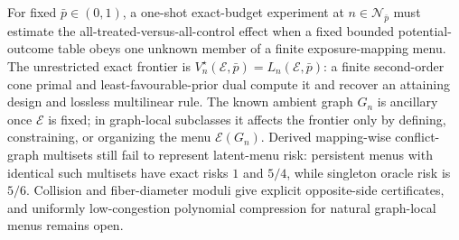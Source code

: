 For fixed \(\bar p\in(0,1)\), a one-shot exact-budget experiment at \(n\in\mathcal N_{\bar p}\) must estimate the all-treated-versus-all-control effect when a fixed bounded potential-outcome table obeys one unknown member of a finite exposure-mapping menu. The unrestricted exact frontier is \(V_n^\star(\mathcal E,\bar p)=L_n(\mathcal E,\bar p)\): a finite second-order cone primal and least-favourable-prior dual compute it and recover an attaining design and lossless multilinear rule. The known ambient graph \(G_n\) is ancillary once \(\mathcal E\) is fixed; in graph-local subclasses it affects the frontier only by defining, constraining, or organizing the menu \(\mathcal E(G_n)\). Derived mapping-wise conflict-graph multisets still fail to represent latent-menu risk: persistent menus with identical such multisets have exact risks \(1\) and \(5/4\), while singleton oracle risk is \(5/6\). Collision and fiber-diameter moduli give explicit opposite-side certificates, and uniformly low-congestion polynomial compression for natural graph-local menus remains open.